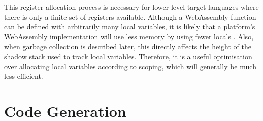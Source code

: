 This register-allocation process is necessary for lower-level target languages where there is only a finite set of registers available. Although a WebAssembly function can be defined with arbitrarily many local variables, it is likely that a platform's WebAssembly implementation will use less memory by using fewer locals \cite{v8, searchfox}. Also, when garbage collection is described later, this directly affects the height of the shadow stack used to track local variables. Therefore, it is a useful optimisation over allocating local variables according to scoping, which will generally be much less efficient.




\section{Code Generation}

